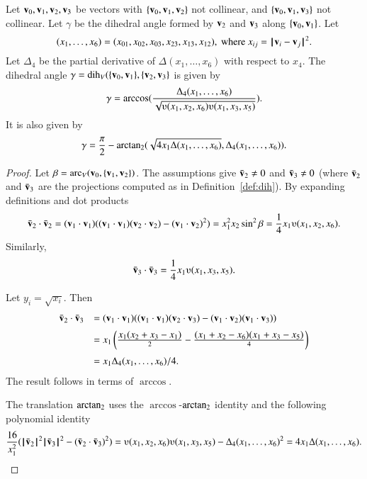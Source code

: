 \begin{lemma} \label{lemma:dihform}
Let ${\mathbf v}_0,{\mathbf v}_1,{\mathbf v}_2,{\mathbf v}_3$ 
be vectors with $\{{\mathbf v}_0,{\mathbf v}_1,{\mathbf v}_2\}$ not collinear, 
and $\{{\mathbf v}_0,{\mathbf v}_1,{\mathbf v}_3\}$ not
collinear. 
Let $\gamma$ be the dihedral angle formed
by ${\mathbf v}_2$ and ${\mathbf v}_3$ along $\{{\mathbf v}_0,{\mathbf v}_1\}$. Let
    $$(x_1,\ldots,x_6) = 
    (x_{01},x_{02},x_{03},x_{23},x_{13},x_{12}),
    \text{ where } x_{ij}={\hskip0.1em|\hskip-0.15em|\hskip0.1em}{\mathbf v}_i - {\mathbf v}_j{\hskip0.1em|\hskip-0.15em|\hskip0.1em}^2.$$
Let $\Delta_4$ be the partial derivative of $\Delta(x_1,\ldots,x_6)$ with
respect to $x_4$.
The dihedral angle $\gamma=\operatorname{dih}_V(\{{\mathbf v}_0,{\mathbf v}_1\},\{{\mathbf v}_2,{\mathbf v}_3\}$
is given by
    $$
    \gamma=\arccos(\frac{\Delta_4(x_1,\ldots,x_6)}{\sqrt{
    \ups(x_1,x_2,x_6)\ups(x_1,x_3,x_5)}}).
    $$
It is also given by
    $$
    \gamma=\frac{\pi}{2} - {\operatorname{arctan_2}}
     ({\sqrt{4 x_1 \Delta(x_1,\ldots,x_6)}},{\Delta_4(x_1,\ldots,x_6)}).
    $$
\end{lemma}
%


\begin{proof}
Let $\beta = \operatorname{arc}_V({\mathbf v}_0,\{{\mathbf v}_1,{\mathbf v}_2\})$.
The assumptions give $\bar {{\mathbf v}}_2\ne 0$ and $\bar {{\mathbf v}}_3 \ne 0$ (where $\bar {{\mathbf v}}_2$ and
$\bar {{\mathbf v}}_3$ are the projections computed as in Definition~\ref{def:dih}).  
%
    By expanding definitions and dot products
    $$
    \bar \v_2\cdot \bar \v_2 = (\v_1\cdot \v_1) ((\v_1\cdot \v_1)(\v_2\cdot \v_2) -
    (\v_1\cdot \v_2)^2) =  x_1^2 x_2 \sin^2 \beta = \frac{1}{4}
    x_1
    \ups(x_1,x_2,x_6).
    $$
    Similarly,
    $$\bar \v_3 \cdot \bar \v_3 = \frac{1}{4} x_1 \ups(x_1,x_3,x_5).$$

Let $y_i = \sqrt{x_i}$. Then
    $$\begin{array}{lll}
    \bar \v_2\cdot \bar \v_3 &= (\v_1\cdot \v_1)((\v_1\cdot \v_1)(\v_2\cdot \v_3) -
    (\v_1\cdot \v_2)(\v_1\cdot \v_3) ) \vspace{6pt} \\  &
    = x_1 \left(\frac{\displaystyle x_1 (x_2 + x_3 -
    x_1)}{2} - \frac{\displaystyle (x_1 + x_2 - x_6)(x_1 + x_3 -
    x_5)}{4} \right)\vspace{6pt}\\&
    = {x_1\Delta_4(x_1,\ldots,x_6)}/{4}.
    \end{array}
    $$
The result follows in terms of $\arccos$.

The translation ${\operatorname{arctan_2}}$ uses the $\arccos$-${\operatorname{arctan_2}}$ identity
and the following polynomial identity
    $$
    \frac{16}{x_1^2}(\normo{\bar \v_2}^2 \normo{\bar \v_3}^2 - (\bar \v_2\cdot \bar \v_3)^2) =
    \ups(x_1,x_2,x_6)\ups(x_1,x_3,x_5) - \Delta_4(x_1,\ldots,x_6)^2
    = 4 x_1 \Delta(x_1,\ldots,x_6).
    $$
\end{proof}






